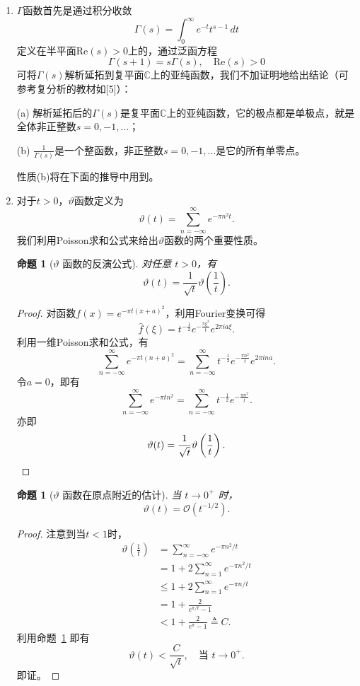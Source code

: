\documentclass[UTF8,zihao=5,linespread=1.34]{ctexart}
\theoremstyle{cnplain}
\newtheorem{proposition}[theorem]{命题}
\theoremstyle{cnremark}
\begin{document}
\begin{enumerate}
\item $\Gamma$函数首先是通过积分收敛
\[
\Gamma(s) = \int_{0}^{\infty} e^{-t} t^{s-1}\,dt
\]
定义在半平面$\mathrm{Re}(s) > 0$上的，通过泛函方程
\[
\Gamma(s+1) = s\Gamma(s),\quad \mathrm{Re}(s) > 0
\]
可将$\Gamma(s)$解析延拓到复平面$\mathbb{C}$上的亚纯函数，我们不加证明地给出结论（可参考复分析的教材如[5]）：

(a) 解析延拓后的$\Gamma(s)$是复平面$\mathbb{C}$上的亚纯函数，它的极点都是单极点，就是全体非正整数$s = 0, -1, \dots$；

(b) $\frac{1}{\Gamma(s)}$是一个整函数，非正整数$s = 0, -1, \dots$是它的所有单零点。

性质(b)将在下面的推导中用到。

\item 对于$t > 0$，$\vartheta$函数定义为
\[
\vartheta(t) = \sum_{n=-\infty}^{\infty} e^{-\pi n^{2}t}.
\]
我们利用Poisson求和公式来给出$\vartheta$函数的两个重要性质。

\begin{proposition}[$\vartheta$ 函数的反演公式]\label{prop:theta-inversion}
对任意 $t>0$，有
\[
\vartheta(t)=\frac{1}{\sqrt{t}}\vartheta\left(\frac{1}{t}\right).
\]
\end{proposition}

\begin{proof}
对函数$f(x) = e^{-\pi t (x+a)^{2}}$，利用Fourier变换可得
\[
\widehat{f}(\xi) = t^{-\frac{1}{2}}
e^{-\frac{\pi \xi^{2}}{t}} e^{2\pi ia\xi}.
\]
利用一维Poisson求和公式，有
\[
\sum_{n=-\infty}^{\infty} e^{-\pi t (n+a)^{2}}
=
\sum_{n=-\infty}^{\infty}
t^{-\frac{1}{2}} e^{-\frac{\pi n^{2}}{t}}e^{2\pi ina}.
\]
令$a = 0$，即有
\[
\sum_{n=-\infty}^{\infty} e^{-\pi t n^{2}}
=
\sum_{n=-\infty}^{\infty}
t^{-\frac{1}{2}} e^{-\frac{\pi n^{2}}{t}}.
\]
亦即
\[
\vartheta(t) = \frac{1}{\sqrt{t}}\vartheta\left(\frac{1}{t}\right).\qedhere
\]
\end{proof}

\begin{proposition}[$\vartheta$ 函数在原点附近的估计]\label{prop:theta-estimate}
当 $t\rightarrow0^{+}$ 时，
\[
\vartheta(t)=\mathcal{O}\!\left(t^{-1/2}\right).
\]
\end{proposition}

\begin{proof}
注意到当$t<1$时，
\begin{align*}
\vartheta\left(\frac{1}{t}\right)
&= \sum_{n=-\infty}^{\infty}e^{-\pi n^{2}/t} \\
&= 1+2\sum_{n=1}^{\infty}e^{-\pi n^{2}/t} \\
&\leq 1+2\sum_{n=1}^{\infty}e^{-\pi n/t} \\
&= 1+\frac{2}{e^{\pi/t}-1} \\
&<1+\frac{2}{e^{\pi}-1}\triangleq C.
\end{align*}
利用命题~\ref{prop:theta-inversion} 即有
\[
\vartheta(t)<\frac{C}{\sqrt{t}},
\quad \text{当 }t\rightarrow0^{+}.
\]
即证。
\end{proof}
\end{enumerate}
\end{document}
